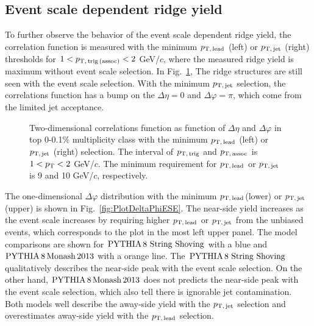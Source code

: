 \subsection{Event scale dependent ridge yield}

To further observe the behavior of the event scale dependent ridge yield, the correlation function is measured with the minimum $p_\mathrm{T,\,lead}$ (left) or $p_\mathrm{T,\,jet}$ (right) thresholds for $1<p_\mathrm{T,\,trig\,(assoc)}<2$ GeV/$c$, where the measured ridge yield is maximum without event scale selection. In Fig.~\ref{fig:PlotCorrHMTSel}, The ridge structures are still seen with the event scale selection. With the minimum $p_\mathrm{T,\,jet}$ selection, the correlations function has a bump on the $\Delta\eta = 0$ and $\Delta\varphi = \pi$, which come from the limited jet acceptance.

\begin{figure}[h!]
	\centering
	\caption{ Two-dimensional correlations function as function of $\Delta\eta$ and $\Delta\varphi$ in top 0-0.1\% multiplicity class with the minimum $p_\mathrm{T,\,lead}$ (left) or $p_\mathrm{T,\,jet}$ (right) selection. The interval of $p_\mathrm{T,\,trig}$ and $p_\mathrm{T,\,assoc}$ is $1<p_\mathrm{T}<2$ GeV/$c$. The minimum requirement for $p_\mathrm{T,\,lead}$ or $p_\mathrm{T,\,jet}$ is 9 and 10 GeV/$c$, respectively. }
	\label{fig:PlotCorrHMTSel}
\end{figure}

The one-dimensional $\Delta\varphi$ distribution with the minimum $p_\mathrm{T,\,lead}$(lower) or $p_\mathrm{T,\,jet}$(upper) is shown in Fig.~\ref{fig:PlotDeltaPhiESE}. The near-side yield increases as the event scale increases by requiring higher $p_\mathrm{T,\,lead}$ or $p_\mathrm{T,\,jet}$ from the unbiased events, which corresponds to the plot in the most left upper panel. The model comparisons are shown for $\mathrm{PYTHIA}\,8~\mathrm{String}~\mathrm{Shoving}$ with a blue and $\mathrm{PYTHIA}\,8\,\mathrm{Monash}\,2013$ with a orange line. The $\mathrm{PYTHIA}\,8~\mathrm{String}~\mathrm{Shoving}$ qualitatively describes the near-side peak with the event scale selection. On the other hand, $\mathrm{PYTHIA}\,8\,\mathrm{Monash}\,2013$ does not predicts the near-side peak with the event scale selection, which also tell there is ignorable jet contamination. Both models well describe the away-side yield with the $p_\mathrm{T,\,jet}$ selection and overestimates away-side yield with the $p_\mathrm{T,\,lead}$ selection.

